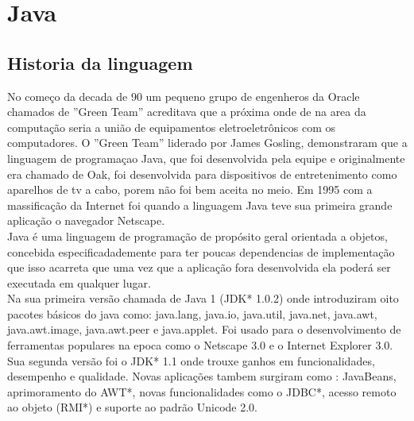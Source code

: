 \chapter{Java}
\section {Historia da linguagem}

No começo da decada de 90 um pequeno grupo de engenheros da Oracle chamados de ''Green Team'' acreditava que a próxima onde de na area da computação seria a união de equipamentos eletroeletrônicos com os computadores. O ''Green Team'' liderado por James Gosling, demonstraram que a linguagem de programaçao Java, que foi desenvolvida pela equipe e originalmente era chamado de Oak, foi desenvolvida para dispositivos de entretenimento como aparelhos de tv a cabo, porem não foi bem aceita no meio. Em 1995 com a massificação da Internet foi quando a linguagem Java teve sua primeira grande aplicação o navegador Netscape.\\

Java é uma linguagem de programação de propósito geral orientada a objetos, concebida especificadademente para ter poucas dependencias de implementação que isso acarreta que uma vez que a aplicação fora desenvolvida ela poderá ser executada em qualquer lugar.\\

Na sua primeira versão chamada de Java 1 (JDK* 1.0.2) onde introduziram oito pacotes básicos do java como: java.lang, java.io, java.util, java.net, java.awt, java.awt.image, java.awt.peer e java.applet. Foi usado para o desenvolvimento de ferramentas populares na epoca como o Netscape 3.0 e o Internet Explorer 3.0. \\

Sua segunda versão foi o JDK* 1.1 onde trouxe ganhos em funcionalidades, desempenho e qualidade. Novas aplicações tambem surgiram como : JavaBeans, aprimoramento do AWT*, novas funcionalidades como o JDBC*, acesso remoto ao objeto (RMI*) e suporte ao padrão Unicode 2.0.\\

